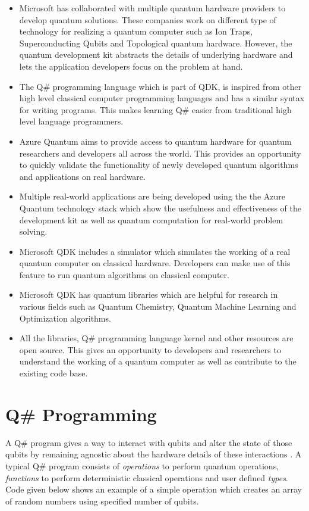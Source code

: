 \documentclass[english,a4paper,11pt,oneside,onecolumn]{book}
\begin{document}
\begin{itemize}
    \item Microsoft has collaborated with multiple quantum hardware providers to develop quantum solutions. These companies work on different type of technology for realizing a quantum computer such as Ion Traps, Superconducting Qubits and Topological quantum hardware. However, the quantum development kit abstracts the details of underlying hardware and lets the application developers focus on the problem at hand.
    
    \item The Q\# programming language which is part of QDK, is inspired from other high level classical computer programming languages and has a similar syntax for writing programs. This makes learning Q\# easier from traditional high level language programmers.
    
    \item Azure Quantum aims to provide access to quantum hardware for quantum researchers and developers all across the world. This provides an opportunity to quickly validate the functionality of newly developed quantum algorithms and applications on real hardware.
    
    \item Multiple real-world applications are being developed using the the Azure Quantum technology stack which show the usefulness and effectiveness of the development kit as well as quantum computation for real-world problem solving.
    
    \item Microsoft QDK includes a simulator which simulates the working of a real quantum computer on classical hardware. Developers can make use of this feature to run quantum algorithms on classical computer.
    
    \item Microsoft QDK has quantum libraries which are helpful for research in various fields such as Quantum Chemistry, Quantum Machine Learning and Optimization algorithms.
    
    \item All the libraries, Q\# programming language kernel and other resources are open source. This gives an opportunity to developers and researchers to understand the working of a quantum computer as well as contribute to the existing code base.
\end{itemize}

\section{Q\# Programming}
\label{sec:qSharp}
A Q\# program gives a way to interact with qubits and alter the state of those qubits by remaining agnostic about the hardware details of these interactions \cite{cjgronlund_microsoft}. A typical Q\# program consists of \emph{operations} to perform quantum operations, \emph{functions} to perform deterministic classical operations and user defined \emph{types}. Code given below shows an example of a simple operation which creates an array of random numbers using specified number of qubits.
\end{document}

